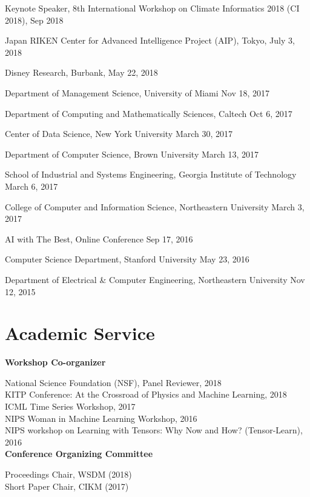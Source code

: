 \documentclass[margin,line]{res}
\begin{document}
\begin{resume}
Keynote Speaker, 8th International Workshop on Climate Informatics 2018 (CI 2018), \hfill {Sep 2018} 

Japan RIKEN  Center for Advanced Intelligence Project (AIP), Tokyo, \hfill {July 3, 2018}

Disney Research, Burbank, \hfill {May 22, 2018}


Department of Management Science,  University of Miami  \hfill {Nov 18, 2017}


Department of Computing and Mathematically Sciences,  Caltech  \hfill {Oct 6, 2017}


Center of Data Science, New York University  \hfill {March 30, 2017}


Department of Computer Science, Brown University   \hfill {March 13, 2017}



School of Industrial and Systems Engineering, Georgia Institute of Technology  \hfill {March 6, 2017}


College of Computer and Information Science, Northeastern University  \hfill {March 3, 2017}


 
 AI with The Best, Online Conference \hfill {Sep 17, 2016}
 
 
Computer Science Department,  Stanford University  \hfill {May 23, 2016}
 
 
Department of  Electrical \& Computer Engineering,  Northeastern University  \hfill {Nov 12, 2015}



\section{\sc Academic Service}
{\bf Workshop Co-organizer}

National Science Foundation (NSF),  Panel Reviewer, 2018\\
KITP Conference: At the Crossroad of Physics and Machine Learning, 2018\\
ICML Time Series  Workshop, 2017 \\
NIPS Woman in Machine Learning Workshop, 2016 \\
NIPS workshop on Learning with Tensors: Why Now and How? (Tensor-Learn), 2016 \\



{\bf Conference Organizing Committee}

Proceedings Chair, WSDM (2018)\\
Short Paper Chair, CIKM (2017)


\end{resume}
\end{document}
